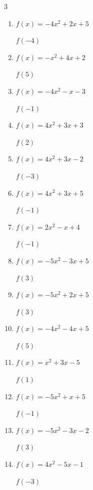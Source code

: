 \begin{multicols}{3}
\begin{enumerate}
\columnbreak %

  \item $f(x)=-4x^{2}+2x+5$

$f(-4)$
        \phantom{$= -67$}

  \item $f(x)=-x^{2}+4x+2$

$f(5)$
        \phantom{$= -3$}

  \item $f(x)=-4x^{2}-x-3$

$f(-1)$
        \phantom{$= -6$}

  \item $f(x)=4x^{2}+3x+3$

$f(2)$
        \phantom{$= 25$}

  \item $f(x)=4x^{2}+3x-2$

$f(-3)$
        \phantom{$= 25$}

  \item $f(x)=4x^{2}+3x+5$

$f(-1)$
        \phantom{$= 6$}

  \item $f(x)=2x^{2}-x+4$

$f(-1)$
        \phantom{$= 7$}

  \item $f(x)=-5x^{2}-3x+5$

$f(3)$
        \phantom{$= -49$}

  \item $f(x)=-5x^{2}+2x+5$

$f(3)$
        \phantom{$= -34$}

  \item $f(x)=-4x^{2}-4x+5$

$f(5)$
        \phantom{$= -115$}

  \item $f(x)=x^{2}+3x-5$

$f(1)$
        \phantom{$= -1$}

  \item $f(x)=-5x^{2}+x+5$

$f(-1)$
        \phantom{$= -1$}

  \item $f(x)=-5x^{2}-3x-2$

$f(3)$
        \phantom{$= -56$}

  \item $f(x)=4x^{2}-5x-1$

$f(-3)$
        \phantom{$= 50$}


\end{enumerate}
\end{multicols}
